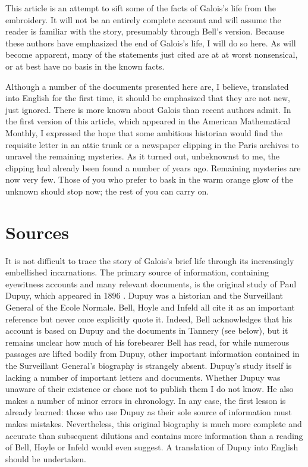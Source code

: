 \documentclass[12pt]{article}
\begin{document}
This article is an attempt to sift some of the facts of Galois's life from the embroidery. It will not be an entirely complete account and will assume the reader is familiar with the story, presumably through Bell's version. Because these authors have emphasized the end of Galois's life, I will do so here. As will become apparent, many of the statements just cited are at at worst nonsensical, or at best have no basis in the known facts.

Although a number of the documents presented here are, I believe, translated into English for the first time, it should be emphasized that they are not new, just ignored. There is more known about Galois than recent authors admit. In the first version of this article, which appeared in the American Mathematical Monthly, I expressed the hope that some ambitious historian would find the requisite letter in an attic trunk or a newspaper clipping in the Paris archives to unravel the remaining mysteries. As it turned out, unbeknownst to me, the clipping had already been found a number of years ago. Remaining mysteries are now very few. Those of you who prefer to bask in the warm orange glow of the unknown should stop now; the rest of you can carry on.

\section{Sources}

It is not difficult to trace the story of Galois's brief life through its increasingly embellished incarnations. The primary source of information, containing eyewitness accounts and many relevant documents, is the original study of Paul Dupuy, which appeared in 1896 \cite{8}. Dupuy was a historian and the Surveillant General of the Ecole Normale. Bell, Hoyle and Infeld all cite it as an important reference but never once explicitly quote it. Indeed, Bell acknowledges that his account is based on Dupuy \cite{9} and the documents in Tannery \cite{10}(see below), but it remains unclear how much of his forebearer Bell has read, for while numerous passages are lifted bodily from Dupuy, other important information contained in the Surveillant General's biography is strangely absent. Dupuy's study itself is lacking a number of important letters and documents. Whether Dupuy was unaware of their existence or chose not to publish them I do not know. He also makes a number of minor errors in chronology. In any case, the first lesson is already learned: those who use Dupuy as their sole source of information must makes mistakes. Nevertheless, this original biography is much more complete and accurate than subsequent dilutions and contains more information than a reading of Bell, Hoyle or Infeld would even suggest. A translation of Dupuy into English should be undertaken.
\end{document}
